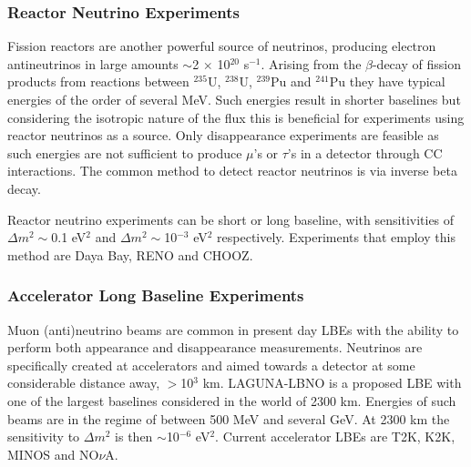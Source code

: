 \subsubsection{Reactor Neutrino Experiments}
Fission reactors are another powerful source of neutrinos, producing electron antineutrinos in large amounts $\sim$2 $\times$ 10$^{20}$ s$^{-1}$. Arising from the $\beta$-decay of fission products from reactions between $^{235}$U, $^{238}$U, $^{239}$Pu and $^{241}$Pu they have typical energies of the order of several MeV. Such energies result in shorter baselines but considering the isotropic nature of the flux this is beneficial for experiments using reactor neutrinos as a source. Only disappearance experiments are feasible as such energies are not sufficient to produce $\mu$'s or $\tau$'s in a detector through CC interactions. The common method to detect reactor neutrinos is via inverse beta decay. 

Reactor neutrino experiments can be short or long baseline, with sensitivities of $\Delta m^{2} \sim$0.1 eV$^{2}$ and $\Delta m^{2} \sim$10$^{-3}$ eV$^{2}$ respectively. Experiments that employ this method are Daya Bay\cite{dayaBayExperiment}, RENO\cite{renoExperiment} and CHOOZ\cite{choozExperiment}.

\subsubsection{Accelerator Long Baseline Experiments}
Muon (anti)neutrino beams are common in present day LBEs with the ability to perform both appearance and disappearance measurements. Neutrinos are specifically created at accelerators and aimed towards a detector at some considerable distance away, $>$10$^{3}$ km. LAGUNA-LBNO is a proposed LBE with one of the largest baselines considered in the world of 2300 km. Energies of such beams are in the regime of between 500 MeV and several GeV. At 2300 km the sensitivity to $\Delta m^{2}$ is then $\sim$10$^{-6}$ eV$^{2}$. Current accelerator LBEs are T2K\cite{t2kExperiment}, K2K\cite{k2kExperiment}, MINOS\cite{minosExperiment} and NO$\nu$A\cite{novaExperiment}.



